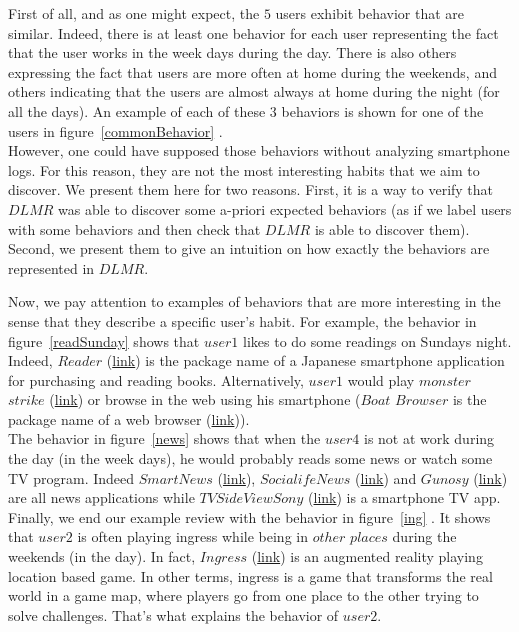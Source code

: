 First of all, and as one might expect, the $5$ users exhibit behavior that are similar. Indeed, there is at least one behavior for each user representing the fact that the user works in the week days during the day. There is also others expressing the fact that users are more often at home during the weekends, and others indicating that the users are almost always at home during the night (for all the days). An example of each of these $3$ behaviors is shown for one of the users in figure~\ref{commonBehavior} . 
\\However, one could have supposed those behaviors without analyzing smartphone logs. For this reason, they are not the most interesting habits that we aim to discover. We present them here for two reasons. First, it is a way to verify that $DLMR$ was able to discover some a-priori expected behaviors (as if we label users with some behaviors and then check that $DLMR$ is able to discover them). Second, we present them to give an intuition on how exactly the behaviors are represented in $DLMR$. \par

Now, we pay attention to examples of behaviors that are more interesting in the sense that they describe a specific user's habit. For example, the behavior in figure~\ref{readSunday} shows that $user1$ likes to do some readings on Sundays night. Indeed, $Reader$ (\href{https://play.google.com/store/apps/details?id=com.sony.drbd.reader.ext.pictorial.ja&hl=fr}{link}) is the package name of a Japanese smartphone application for purchasing and reading books. Alternatively, $user1$ would play $monster$ $strike$ (\href{https://play.google.com/store/apps/details?id=jp.co.mixi.monsterstrikeUS&hl=fr}{link}) or browse in the web using his smartphone ($Boat$ $Browser$ is the package name of a web browser (\href{https://play.google.com/store/apps/details?id=com.boatbrowser.free&hl=fr}{link})). 
\\The behavior in figure~\ref{news} shows that when the $user4$ is not at work during the day (in the week days), he would probably reads some news or watch some TV program. Indeed $SmartNews$ (\href{https://play.google.com/store/apps/details?id=jp.gocro.smartnews.android}{link}), $Socialife News$ (\href{https://play.google.com/store/apps/details?id=com.sony.nfx.app.sfrc&hl=fr}{link}) and $Gunosy$ (\href{https://play.google.com/store/apps/details?id=com.gunosy.android.world}{link}) are all news applications while $TV SideView Sony$ (\href{https://play.google.com/store/apps/details?id=com.sony.tvsideview.phone&hl=fr}{link}) is a smartphone TV app.
\\Finally, we end our example review with the behavior in figure~\ref{ing} . It shows that $user2$ is often playing ingress while being in $other$ $places$ during the weekends (in the day). In fact, $Ingress$ (\href{https://play.google.com/store/apps/details?id=com.nianticproject.ingress&hl=fr}{link}) is an augmented reality playing location based game. In other terms, ingress is a game that transforms the real world in a game map, where players go from one place to the other trying to solve challenges. That's what explains the behavior of $user2$. \par


